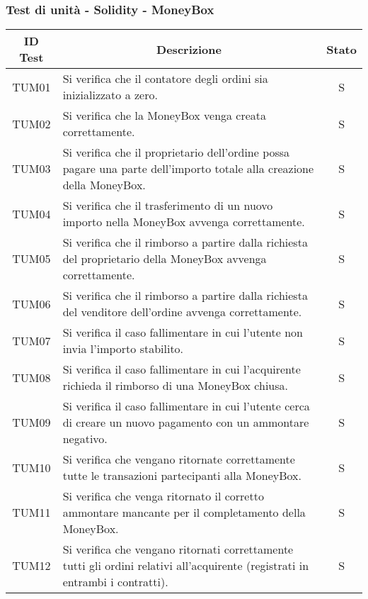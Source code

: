 \subsubsection{Test di unità - Solidity - MoneyBox} \label{subsubsection:TUM}
\begin{table}[H]
  \centering
  \renewcommand{\arraystretch}{1.8}
  \begin{tabular}{c|p{10cm}|c}
    \rowcolor[HTML]{125E28}
    \color[HTML]{FFFFFF}\textbf{ID Test}
          & \multicolumn{1}{c}{\color[HTML]{FFFFFF}\textbf{Descrizione}}
          & \color[HTML]{FFFFFF}\textbf{Stato}                                                                                                 \\
    \hline
    TUM01 & Si verifica che il contatore degli ordini sia inizializzato a zero.                                                            & S \\
    TUM02 & Si verifica che la MoneyBox\glo{} venga creata correttamente.                                                                  & S \\
    TUM03 & Si verifica che il proprietario dell'ordine possa pagare una parte dell'importo totale alla creazione della MoneyBox\glo{}.    & S \\
    TUM04 & Si verifica che il trasferimento di un nuovo importo nella MoneyBox\glo{} avvenga correttamente.                               & S \\
    TUM05 & Si verifica che il rimborso a partire dalla richiesta del proprietario della MoneyBox\glo{} avvenga correttamente.             & S \\
    TUM06 & Si verifica che il rimborso a partire dalla richiesta del venditore dell'ordine avvenga correttamente.                         & S \\
    TUM07 & Si verifica il caso fallimentare in cui l'utente non invia l'importo stabilito.                                                & S \\
    TUM08 & Si verifica il caso fallimentare in cui l'acquirente richieda il rimborso di una MoneyBox\glo{} chiusa.                        & S \\
    TUM09 & Si verifica il caso fallimentare in cui l'utente cerca di creare un nuovo pagamento con un ammontare negativo.                 & S \\
    TUM10 & Si verifica che vengano ritornate correttamente tutte le transazioni partecipanti alla MoneyBox\glo{}.                         & S \\
    TUM11 & Si verifica che venga ritornato il corretto ammontare mancante per il completamento della MoneyBox\glo{}.                      & S \\
    TUM12 & Si verifica che vengano ritornati correttamente tutti gli ordini relativi all'acquirente (registrati in entrambi i contratti). & S \\
  \end{tabular}
\end{table}
